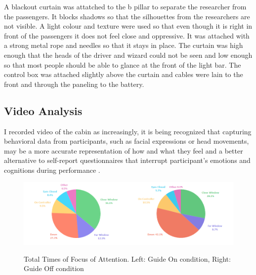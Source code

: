 A blackout curtain was attatched to the b pillar to separate the researcher from the passengers. It blocks shadows so that the silhouettes from the researchers are not visible. A light colour and texture were used so that even though it is right in front of the passengers it does not feel close and oppressive. It was attached with a strong metal rope and needles so that it stays in place. The curtain was high enough that the heads of the driver and wizard could not be seen and low enough so that most people should be able to glance at the front of the light bar.  The control box was attached slightly above the curtain and cables were lain to the front and through the paneling to the battery. 

\subsection{Video Analysis}
\label{sec:videoAnalysis}

I recorded video of the cabin as increasingly, it is being recognized that capturing behavioral data from participants, such as facial expressions or head movements, may be a more accurate representation of how and what they feel and a better alternative to self-report questionnaires that interrupt participant’s emotions and cognitions during performance \cite{Ahn2011UsingPrediction}.

\begin{figure}
    \includegraphics[width=0.5\textwidth]{fig/PieTotal.png}\includegraphics[width=0.5\textwidth]{fig/PieTotalNo.png}
    \caption[Total Times of Focus of Attention]{Total Times of Focus of Attention. Left: Guide On condition, Right: Guide Off condition}
    \label{fig:totalPie}
\end{figure}

